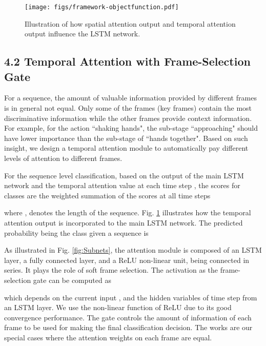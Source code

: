 \documentclass[letterpaper]{article}
\begin{document}
\begin{figure}[t]
\begin{center}
		\texttt{[image: figs/framework-objectfunction.pdf]} \end{center}
	\vspace{-4mm}
	\caption{Illustration of how spatial attention output  and temporal attention output  influence the LSTM network.}
\label{fig:network}
	\vspace{1mm}
\end{figure}

\subsection{4.2 Temporal Attention with Frame-Selection Gate}

For a sequence, the amount of valuable information provided by different frames is in general not equal. Only some of the frames (key frames) contain the most discriminative information while the other frames provide context information. For example, for the action ``shaking hands", the sub-stage ``approaching" should have lower importance than the sub-stage of ``hands together". Based on such insight, we design a temporal attention module to automatically pay different levels of attention  to different frames.

For the sequence level classification, based on the output  of the main LSTM network and the temporal attention value  at each time step , the scores for  classes are the weighted summation of the scores at all time steps
\vspace{-1mm}

where ,  denotes the length of the sequence. Fig. \ref{fig:network} illustrates how the temporal attention output  is incorporated to the main LSTM network. The predicted probability being the  class given a sequence  is



As illustrated in Fig. \ref{fig:Subnets}, the attention module is composed of an LSTM layer, a fully connected layer, and a ReLU non-linear unit, being connected in series. It plays the role of soft frame selection. The activation as the frame-selection gate can be computed as

which depends on the current input , and the hidden variables  of time step  from an LSTM layer. We use the non-linear function of ReLU due to its good convergence performance. The gate controls the amount of information of each frame to be used for making the final classification decision. The works \cite{CVPR15HRNN,zhu2015co} are our special cases where the attention weights on each frame are equal.
\end{document}
